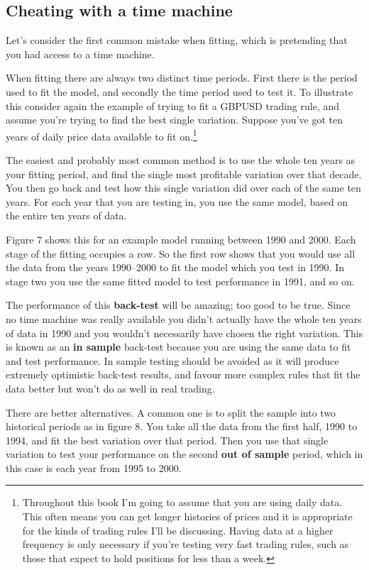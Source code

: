 \subsection*{Cheating with a time machine}

Let's consider the first common mistake when fitting, which is pretending that you had access to a time machine.

When fitting there are always two distinct time periods. First there is the period used to fit the model, and secondly the time period used to test it. To illustrate this consider again the example of trying to fit a GBPUSD trading rule, and assume you're trying to find the best single variation. Suppose you've got ten years of daily price data available to fit on.\footnote{Throughout this book I'm going to assume that you are using daily data. This often means you can get longer histories of prices and it is appropriate for the kinds of trading rules I'll be discussing. Having data at a higher frequency is only necessary if you're testing very fast trading rules, such as those that expect to hold positions for less than a week.}

The easiest and probably most common method is to use the whole ten years as your fitting period, and find the single most profitable variation over that decade. You then go back and test how this single variation did over each of the same ten years. For each year that you are testing in, you use the same model, based on the entire ten years of data.

Figure 7 shows this for an example model running between 1990 and 2000. Each stage of the fitting occupies a row. So the first row shows that you would use all the data from the years 1990--2000 to fit the model which you test in 1990. In stage two you use the same fitted model to test performance in 1991, and so on.

The performance of this \textbf{back-test} will be amazing; too good to be true. Since no time machine was really available you didn't actually have the whole ten years of data in 1990 and you wouldn't necessarily have chosen the right variation. This is known as an \textbf{in sample} back-test because you are using the same data to fit and test performance. In sample testing should be avoided as it will produce extremely optimistic back-test results, and favour more complex rules that fit the data better but won't do as well in real trading.

There are better alternatives. A common one is to split the sample into two historical periods as in figure 8. You take all the data from the first half, 1990 to 1994, and fit the best variation over that period. Then you use that single variation to test your performance on the second \textbf{out of sample} period, which in this case is each year from 1995 to 2000.

